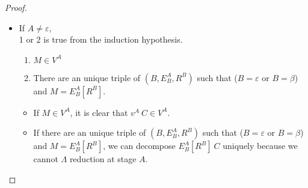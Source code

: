 \begin{proof}
\begin{itemize}
\begin{itemize}
		      	\item If $ A \neq \varepsilon $,\\
		      	      1 or 2 is true from the induction hypothesis.
		      	      \begin{enumerate}
		      	      	\item $ M \in V^A$
		      	      	\item There are an unique triple of $(B, E^A_B, R^B)$ such that ($B = \varepsilon$ or $B = \beta$) and $M = E^A_B[R^B]$.
		      	      \end{enumerate}
		      	      \begin{itemize}
		      	      	\item If $ M \in V^A$,
		      	      	    it is clear that $v^A\ C \in V^A$.
		      	      	\item If there are an unique triple of $(B, E^A_B, R^B)$ such that ($B = \varepsilon$ or $B = \beta$) and $M = E^A_B[R^B]$,
		      	      	    we can decompose $E^A_B[R^B]\ C$ uniquely because we cannot $\Lambda$ reduction at stage $A$.
		      	      \end{itemize}
		      \end{itemize}
		      		      	      	      	      	      	      	      	      	      	      	      	      		      	      	      	      
		      		      	      	      	      	      	      	      	      	      	      	      	      		      	      	      	      
		      	      		      	      	      	      	      	      	      	      	      	      	      	      	      	      	      	      	      	      	      	      	      	      	      	      		      	      	      	      	      	      	      	      
		      	      		      	      	      	      	      	      	      	      	      	      	      	      	      	      	      	      	      	      	      	      	      	      	      	      		      	      	      	      	      	      	      	      
		      	      		      	      	      	      	      	      	      	      	      	      	      	      	      	      	      	      	      	      	      	      	      	      	      	      		      	      	      	      	      	      	      	      

\end{itemize}
\end{proof}
